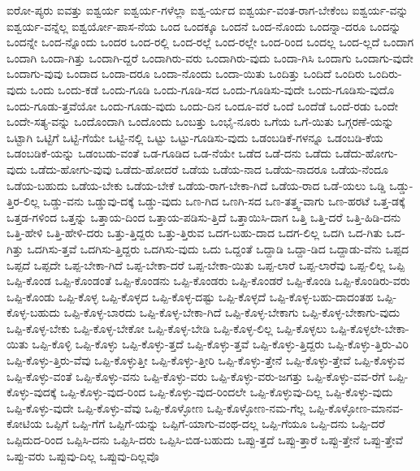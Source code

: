 {ಐರೋ-ಪ್ಯರು
ಐವತ್ತು
ಐಶ್ವರ್ಯ
ಐಶ್ವರ್ಯ-ಗಳೆಲ್ಲಾ
ಐಶ್ವ-ರ್ಯದ
ಐಶ್ವರ್ಯ-ವಂತ-ರಾಗ-ಬೇಕೆಂಬ
ಐಶ್ವರ್ಯ-ವನ್ನು
ಐಶ್ವರ್ಯ-ವನ್ನೆಲ್ಲ
ಐಶ್ವರ್ಯೋ-ಪಾಸ-ನೆಯ
ಒಂದ
ಒಂದಕ್ಕೂ
ಒಂದನೆ
ಒಂದ-ನೊಂದು
ಒಂದನ್ನಾ-ದರೂ
ಒಂದನ್ನು
ಒಂದನ್ನೇ
ಒಂದ-ನ್ನೊಂದು
ಒಂದರ
ಒಂದ-ರಲ್ಲಿ
ಒಂದ-ರಲ್ಲೆ
ಒಂದ-ರಲ್ಲೇ
ಒಂದ-ರಿಂದ
ಒಂದಲ್ಲ
ಒಂದ-ಲ್ಲದೆ
ಒಂದಾಗ
ಒಂದಾಗಿ
ಒಂದಾ-ಗಿತ್ತು
ಒಂದಾಗಿ-ದ್ದರೆ
ಒಂದಾಗಿರು-ವರು
ಒಂದಾಗಿರು-ವುದು
ಒಂದಾ-ಗಿಸಿ
ಒಂದಾಗು
ಒಂದಾಗು-ವುದೇ
ಒಂದಾಗು-ವುವು
ಒಂದಾದ
ಒಂದಾ-ದರೂ
ಒಂದಾ-ನೊಂದು
ಒಂದಾ-ಯಿತು
ಒಂದಿತ್ತು
ಒಂದಿದೆ
ಒಂದಿರು
ಒಂದಿರು-ವುದು
ಒಂದು
ಒಂದು-ಕಡೆ
ಒಂದು-ಗೂಡಿ
ಒಂದು-ಗೂಡಿ-ಸದ
ಒಂದು-ಗೂಡಿಸು-ವುದೇ
ಒಂದು-ಗೂಡಿಸು-ವುದೊ
ಒಂದು-ಗೂಡು-ತ್ತವೆಯೋ
ಒಂದು-ಗೂಡು-ವುದು
ಒಂದು-ದಿನ
ಒಂದೂ-ವರೆ
ಒಂದೆ
ಒಂದೆಡೆ
ಒಂದೆ-ರಡು
ಒಂದೇ
ಒಂದೇ-ಸತ್ಯ-ವನ್ನು
ಒಂದೊಂದಾಗಿ
ಒಂದೊಂದು
ಒಂಬತ್ತು
ಒಂಭೈ-ನೂರು
ಒಗೆಯ
ಒಗೆ-ಯಿತು
ಒಗ್ಗರಣೆ-ಯನ್ನು
ಒಟ್ಟಾಗಿ
ಒಟ್ಟಿಗೆ
ಒಟ್ಟಿ-ಗೆಯೇ
ಒಟ್ಟಿ-ನಲ್ಲಿ
ಒಟ್ಟು
ಒಟ್ಟು-ಗೂಡಿಸು-ವುದು
ಒಡಂಬಡಿಕೆ-ಗಳನ್ನೂ
ಒಡಂಬಡಿ-ಕೆಯ
ಒಡಂಬಡಿಕೆ-ಯನ್ನು
ಒಡಂಬಡು-ವಂತೆ
ಒಡ-ಗೂಡಿದ
ಒಡ-ನೆಯೇ
ಒಡೆದ
ಒಡೆ-ದನು
ಒಡೆದು
ಒಡೆದು-ಹೋಗು-ವುದು
ಒಡೆದು-ಹೋಗು-ವುವು
ಒಡೆದು-ಹೋದರೆ
ಒಡೆಯ
ಒಡೆಯ-ನಾದ
ಒಡೆಯ-ನಾದರೂ
ಒಡೆಯ-ನೆಂದೂ
ಒಡೆಯ-ಬಹುದು
ಒಡೆಯ-ಬೇಕು
ಒಡೆಯ-ಬೇಕೆ
ಒಡೆಯ-ರಾಗ-ಬೇಕಾ-ಗಿದೆ
ಒಡೆಯ-ರಾದ
ಒಡೆ-ಯಲು
ಒಡ್ಡಿ
ಒಡ್ಡು-ತ್ತಿರ-ಲಿಲ್ಲ
ಒಡ್ಡು-ವನು
ಒಡ್ಡುವು-ದಕ್ಕೆ
ಒಡ್ಡು-ವುದು
ಒಣ-ಗಿದ
ಒಣಗಿ-ಸದ
ಒಣ-ತತ್ತ್ವ-ವಾಗು
ಒಣ-ಹರಟೆ
ಒತ್ತ-ಡಕ್ಕೆ
ಒತ್ತಡ-ಗಳಿಂದ
ಒತ್ತನ್ನು
ಒತ್ತಾಯ-ದಿಂದ
ಒತ್ತಾಯ-ಪಡಿಸು-ತ್ತಿದೆ
ಒತ್ತಾಯಿಸಿ-ದಾಗ
ಒತ್ತಿ
ಒತ್ತಿ-ದರೆ
ಒತ್ತಿ-ಹಿಡಿ-ದನು
ಒತ್ತಿ-ಹೇಳಿ
ಒತ್ತಿ-ಹೇಳಿ-ದರು
ಒತ್ತು-ತ್ತಿದ್ದರು
ಒತ್ತು-ತ್ತಿರುವ
ಒದಗ-ಬಹು-ದಾದ
ಒದಗ-ಲಿಲ್ಲ
ಒದಗಿ
ಒದ-ಗಿತು
ಒದ-ಗಿತ್ತು
ಒದಗಿಸು-ತ್ತವೆ
ಒದಗಿಸು-ತ್ತಿದ್ದರು
ಒದಗಿಸು-ವುದು
ಒದು
ಒದ್ದಂತೆ
ಒದ್ದಾಡಿ
ಒದ್ದಾ-ಡಿದ
ಒದ್ದಾಡು-ವೆನು
ಒಪ್ಪದ
ಒಪ್ಪದೆ
ಒಪ್ಪದೇ
ಒಪ್ಪ-ಬೇಕಾ-ಗಿದೆ
ಒಪ್ಪ-ಬೇಕಾ-ದರೆ
ಒಪ್ಪ-ಬೇಕಾ-ಯಿತು
ಒಪ್ಪ-ಲಾರೆ
ಒಪ್ಪ-ಲಾರೆವು
ಒಪ್ಪ-ಲಿಲ್ಲ
ಒಪ್ಪಿ
ಒಪ್ಪಿ-ಕೊಂಡ
ಒಪ್ಪಿ-ಕೊಂಡಂತೆ
ಒಪ್ಪಿ-ಕೊಂಡನು
ಒಪ್ಪಿ-ಕೊಂಡರು
ಒಪ್ಪಿ-ಕೊಂಡರೆ
ಒಪ್ಪಿ-ಕೊಂಡಿ
ಒಪ್ಪಿ-ಕೊಂಡಿರು-ವರು
ಒಪ್ಪಿ-ಕೊಂಡು
ಒಪ್ಪಿ-ಕೊಳ್ಳ
ಒಪ್ಪಿ-ಕೊಳ್ಳದ
ಒಪ್ಪಿ-ಕೊಳ್ಳ-ದಷ್ಟು
ಒಪ್ಪಿ-ಕೊಳ್ಳದೆ
ಒಪ್ಪಿ-ಕೊಳ್ಳ-ಬಹು-ದಾದಂತಹ
ಒಪ್ಪಿ-ಕೊಳ್ಳ-ಬಹುದು
ಒಪ್ಪಿ-ಕೊಳ್ಳ-ಬಾರದು
ಒಪ್ಪಿ-ಕೊಳ್ಳ-ಬೇಕಾ-ಗಿದೆ
ಒಪ್ಪಿ-ಕೊಳ್ಳ-ಬೇಕಾಗು
ಒಪ್ಪಿ-ಕೊಳ್ಳ-ಬೇಕಾಗು-ವುದು
ಒಪ್ಪಿ-ಕೊಳ್ಳ-ಬೇಕು
ಒಪ್ಪಿ-ಕೊಳ್ಳ-ಬೇಕೋ
ಒಪ್ಪಿ-ಕೊಳ್ಳ-ಬೇಡಿ
ಒಪ್ಪಿ-ಕೊಳ್ಳ-ಲಿಲ್ಲ
ಒಪ್ಪಿ-ಕೊಳ್ಳಲು
ಒಪ್ಪಿ-ಕೊಳ್ಳಲೇ-ಬೇಕಾ-ಯಿತು
ಒಪ್ಪಿ-ಕೊಳ್ಳಿ
ಒಪ್ಪಿ-ಕೊಳ್ಳು
ಒಪ್ಪಿ-ಕೊಳ್ಳು-ತ್ತದೆ
ಒಪ್ಪಿ-ಕೊಳ್ಳು-ತ್ತವೆ
ಒಪ್ಪಿ-ಕೊಳ್ಳು-ತ್ತಿದ್ದರು
ಒಪ್ಪಿ-ಕೊಳ್ಳು-ತ್ತಿರು-ವಿರಿ
ಒಪ್ಪಿ-ಕೊಳ್ಳು-ತ್ತಿರು-ವೆವು
ಒಪ್ಪಿ-ಕೊಳ್ಳುತ್ತೀ
ಒಪ್ಪಿ-ಕೊಳ್ಳು-ತ್ತೀರಿ
ಒಪ್ಪಿ-ಕೊಳ್ಳು-ತ್ತೇನೆ
ಒಪ್ಪಿ-ಕೊಳ್ಳು-ತ್ತೇವೆ
ಒಪ್ಪಿ-ಕೊಳ್ಳುವ
ಒಪ್ಪಿ-ಕೊಳ್ಳು-ವಂತೆ
ಒಪ್ಪಿ-ಕೊಳ್ಳು-ವನು
ಒಪ್ಪಿ-ಕೊಳ್ಳು-ವರು
ಒಪ್ಪಿ-ಕೊಳ್ಳು-ವರು-ಜಗತ್ತು
ಒಪ್ಪಿ-ಕೊಳ್ಳು-ವವ-ರೆಗೆ
ಒಪ್ಪಿ-ಕೊಳ್ಳು-ವುದಕ್ಕೆ
ಒಪ್ಪಿ-ಕೊಳ್ಳು-ವುದ-ರಿಂದ
ಒಪ್ಪಿ-ಕೊಳ್ಳು-ವುದ-ರಿಂದಲೇ
ಒಪ್ಪಿ-ಕೊಳ್ಳುವು-ದಿಲ್ಲ
ಒಪ್ಪಿ-ಕೊಳ್ಳು-ವುದು
ಒಪ್ಪಿ-ಕೊಳ್ಳು-ವುದೇ
ಒಪ್ಪಿ-ಕೊಳ್ಳು-ವೆವು
ಒಪ್ಪಿ-ಕೊಳ್ಳೋಣ
ಒಪ್ಪಿ-ಕೊಳ್ಳೋಣ-ನಮ-ಗೆಲ್ಲ
ಒಪ್ಪಿ-ಕೊಳ್ಳೋಣ-ಮಾನವ-ಕೋಟಿಯ
ಒಪ್ಪಿಗೆ
ಒಪ್ಪಿ-ಗೆಗೆ
ಒಪ್ಪಿಗೆ-ಯನ್ನು
ಒಪ್ಪಿಗೆ-ಯಾಗು-ವಂಥ-ದಲ್ಲ
ಒಪ್ಪಿ-ಗೆಯೂ
ಒಪ್ಪಿ-ದನು
ಒಪ್ಪಿ-ದರೆ
ಒಪ್ಪಿದುದ-ರಿಂದ
ಒಪ್ಪಿಸಿ-ದನು
ಒಪ್ಪಿಸಿ-ದರು
ಒಪ್ಪಿಸಿ-ಬಿಡ-ಬಹುದು
ಒಪ್ಪು-ತ್ತದೆ
ಒಪ್ಪು-ತ್ತಾರೆ
ಒಪ್ಪು-ತ್ತೇನೆ
ಒಪ್ಪು-ತ್ತೇವೆ
ಒಪ್ಪು-ವರು
ಒಪ್ಪುವು-ದಿಲ್ಲ
ಒಪ್ಪುವು-ದಿಲ್ಲವೊ
}
